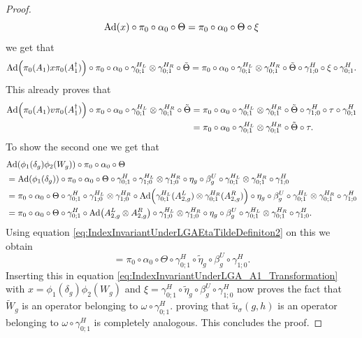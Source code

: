 \documentclass[12pt,a4paper,twoside]{article}
\let\originalleft\left
\let\originalright\right
\renewcommand{\left}{\mathopen{}\mathclose\bgroup\originalleft}
\renewcommand{\right}{\aftergroup\egroup\originalright}
\newcommand{\Ad}[1]{\textrm{Ad}\left(#1\right)}
\theoremstyle{definition}
\numberwithin{equation}{section}
\begin{document}
\begin{proof}
	\begin{equation}
		\Ad{x}\circ\pi_0\circ\alpha_0\circ\Theta=\pi_0\circ\alpha_0\circ\Theta\circ\xi
	\end{equation}
	we get that
	\begin{equation}\label{eq:IndexInvariantUnderLGA_A1_Transformation}
		\Ad{\pi_0(A_1)x\pi_0(A_1^\dagger)}\circ\pi_0\circ\alpha_0\circ\gamma^{H_L}_{0;1}\otimes\gamma^{H_R}_{0;1}\circ\tilde{\Theta}=\pi_0\circ\alpha_0\circ\gamma^{H_L}_{0;1}\otimes\gamma^{H_R}_{0;1}\circ\tilde{\Theta}\circ\gamma^H_{1;0}\circ\xi\circ\gamma^H_{0;1}.
	\end{equation}
	This already proves that
	\begin{align}
		\Ad{\pi_0(A_1)v\pi_0(A_1^\dagger)}\circ\pi_0\circ\alpha_0\circ\gamma^{H_L}_{0;1}\otimes\gamma^{H_R}_{0;1}\circ\tilde{\Theta}&=\pi_0\circ\alpha_0\circ\gamma^{H_L}_{0;1}\otimes\gamma^{H_R}_{0;1}\circ\tilde{\Theta}\circ\gamma^H_{1;0}\circ\tau\circ\gamma^H_{0;1}\\
		&=\pi_0\circ\alpha_0\circ\gamma^{H_L}_{0;1}\otimes\gamma^{H_R}_{0;1}\circ\tilde{\Theta}\circ\tau.
	\end{align}
	To show the second one we get that
	\begin{align}
		&\Ad{\phi_1(\delta_g)\phi_2(W_g)}\circ\pi_0\circ\alpha_0\circ\Theta\\
		&=\Ad{\phi_1(\delta_g)}\circ\pi_0\circ\alpha_0\circ\Theta\circ\gamma^{H}_{0;1}\circ\gamma^{H_L}_{1;0}\otimes\gamma^{H_R}_{1;0}\circ\eta_g\circ\beta_g^U\circ\gamma^{H_L}_{0;1}\otimes\gamma^{H_R}_{0;1}\circ\gamma^H_{1;0}\\
		&=\pi_0\circ\alpha_0\circ\Theta\circ\gamma^{H}_{0;1}\circ\gamma^{H_L}_{1;0}\otimes\gamma^{H_R}_{1;0}\circ\Ad{\gamma^{H_L}_{0;1}(A_{2,g}^L)\otimes\gamma^{H_R}_{0;1}(A_{2,g}^R)}\circ\eta_g\circ\beta_g^U\circ\gamma^{H_L}_{0;1}\otimes\gamma^{H_R}_{0;1}\circ\gamma^H_{1;0}\\
		&=\pi_0\circ\alpha_0\circ\Theta\circ\gamma^{H}_{0;1}\circ\Ad{A_{2,g}^L\otimes A_{2,g}^R}\circ\gamma^{H_L}_{1;0}\otimes\gamma^{H_R}_{1;0}\circ\eta_g\circ\beta_g^U\circ\gamma^{H_L}_{0;1}\otimes\gamma^{H_R}_{0;1}\circ\gamma^H_{1;0}.
	\end{align}
	Using equation \eqref{eq:IndexInvariantUnderLGAEtaTildeDefiniton2} on this we obtain
	\begin{equation}
		=\pi_0\circ\alpha_0\circ\Theta\circ\gamma^H_{0;1}\circ\tilde{\eta}_g\circ\beta_g^U\circ\gamma^H_{1;0}.
	\end{equation}
	Inserting this in equation \eqref{eq:IndexInvariantUnderLGA_A1_Transformation} with $x=\phi_1(\delta_g)\phi_2(W_g)$ and $\xi=\gamma^H_{0;1}\circ\tilde{\eta}_g\circ\beta_g^U\circ\gamma^H_{1;0}$ now proves the fact that $\tilde{W}_g$ is an operator belonging to $\omega\circ\gamma^H_{0;1}$. proving that $\tilde u_\sigma(g,h)$ is an operator belonging to $\omega\circ\gamma_{0;1}^H$ is completely analogous. This concludes the proof.
\end{proof}
\end{document}
